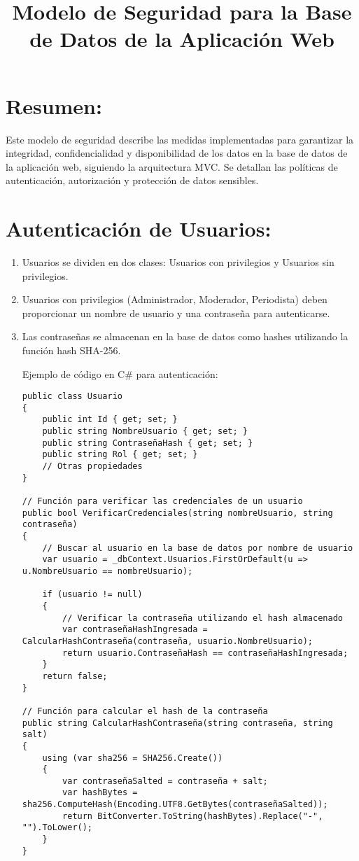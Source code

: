\documentclass{article}
\title{Modelo de Seguridad para la Base de Datos de la Aplicación Web}
\date{}
\begin{document}
\maketitle

\section*{Resumen:}
Este modelo de seguridad describe las medidas implementadas para garantizar la integridad, confidencialidad y disponibilidad de los datos en la base de datos de la aplicación web, siguiendo la arquitectura MVC. Se detallan las políticas de autenticación, autorización y protección de datos sensibles.

\section{Autenticación de Usuarios:}

\begin{enumerate}[label=1.\arabic*]
\item Usuarios se dividen en dos clases: Usuarios con privilegios y Usuarios sin privilegios.
\item Usuarios con privilegios (Administrador, Moderador, Periodista) deben proporcionar un nombre de usuario y una contraseña para autenticarse.
\item Las contraseñas se almacenan en la base de datos como hashes utilizando la función hash SHA-256.

Ejemplo de código en C# para autenticación:

\begin{verbatim}
public class Usuario
{
    public int Id { get; set; }
    public string NombreUsuario { get; set; }
    public string ContraseñaHash { get; set; }
    public string Rol { get; set; }
    // Otras propiedades
}

// Función para verificar las credenciales de un usuario
public bool VerificarCredenciales(string nombreUsuario, string contraseña)
{
    // Buscar al usuario en la base de datos por nombre de usuario
    var usuario = _dbContext.Usuarios.FirstOrDefault(u => u.NombreUsuario == nombreUsuario);

    if (usuario != null)
    {
        // Verificar la contraseña utilizando el hash almacenado
        var contraseñaHashIngresada = CalcularHashContraseña(contraseña, usuario.NombreUsuario);
        return usuario.ContraseñaHash == contraseñaHashIngresada;
    }
    return false;
}

// Función para calcular el hash de la contraseña
public string CalcularHashContraseña(string contraseña, string salt)
{
    using (var sha256 = SHA256.Create())
    {
        var contraseñaSalted = contraseña + salt;
        var hashBytes = sha256.ComputeHash(Encoding.UTF8.GetBytes(contraseñaSalted));
        return BitConverter.ToString(hashBytes).Replace("-", "").ToLower();
    }
}
\end{verbatim}

\end{enumerate}
\end{document}
